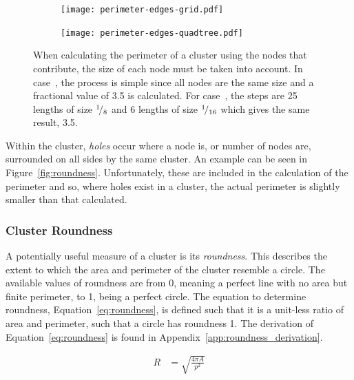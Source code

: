 \begin{figure}[tbhp]
	\centering
	\begin{subfigure}[c]{3.5cm}
		\texttt{[image: perimeter-edges-grid.pdf]}
		\caption{}\label{fig:perimeter-edges-grid.pdf}
	\end{subfigure}%
	\quad
	\begin{subfigure}[c]{3.5cm}
		\texttt{[image: perimeter-edges-quadtree.pdf]}
		\caption{}\label{fig:perimeter-edges-quadtree.pdf}
	\end{subfigure}

	\caption[Perimeter size from node edge size.]{When calculating the
		perimeter of a cluster using the nodes that contribute, the size of
		each node must be taken into account. In
		case~, the process is simple since
		all nodes are the same size and a fractional value of 3.5 is
		calculated. For case~, the
		steps are 25 lengths of size ${}^{1}\!/_{8}$ and 6 lengths of size
		${}^{1}\!/_{16}$ which gives the same result,
		3.5.}\label{fig:perimeter-edges}

\end{figure}

Within the cluster, \emph{holes} occur where a node is, or number of nodes are,
surrounded on all sides by the same cluster. An example can be seen in
Figure~\ref{fig:roundness}. Unfortunately, these are included in the
calculation of the perimeter and so, where holes exist in a cluster, the actual
perimeter is slightly smaller than that calculated.

\subsubsection{Cluster Roundness}
\label{ssub:Cluster_Roundness}

A potentially useful measure of a cluster is its \emph{roundness}. This
describes the extent to which the area and perimeter of the cluster resemble a
circle. The available values of roundness are from 0, meaning a perfect line
with no area but finite perimeter, to 1, being a perfect circle. The equation
to determine roundness, Equation~\ref{eq:roundness}, is defined such that it is
a unit-less ratio of area and perimeter, such that a circle has roundness 1.
The derivation of Equation~\ref{eq:roundness} is found in
Appendix~\ref{app:roundness_derivation}.

\begin{align}
	R &= \sqrt{\frac{4\pi A}{p^2}} \label{eq:roundness}
\end{align}

